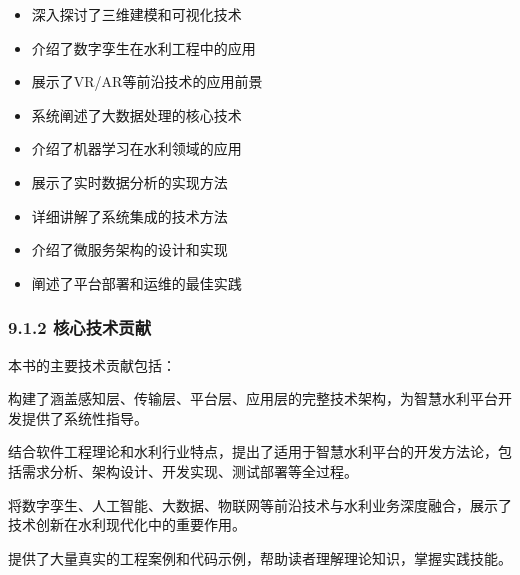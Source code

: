 
\begin{itemize}
\tightlist
\item
  深入探讨了三维建模和可视化技术
\item
  介绍了数字孪生在水利工程中的应用
\item
  展示了VR/AR等前沿技术的应用前景
\end{itemize}


\begin{itemize}
\tightlist
\item
  系统阐述了大数据处理的核心技术
\item
  介绍了机器学习在水利领域的应用
\item
  展示了实时数据分析的实现方法
\end{itemize}


\begin{itemize}
\tightlist
\item
  详细讲解了系统集成的技术方法
\item
  介绍了微服务架构的设计和实现
\item
  阐述了平台部署和运维的最佳实践
\end{itemize}

\hypertarget{ux6838ux5fc3ux6280ux672fux8d21ux732e}{%
\subsubsection{9.1.2 核心技术贡献}\label{ux6838ux5fc3ux6280ux672fux8d21ux732e}}

本书的主要技术贡献包括：


构建了涵盖感知层、传输层、平台层、应用层的完整技术架构，为智慧水利平台开发提供了系统性指导。


结合软件工程理论和水利行业特点，提出了适用于智慧水利平台的开发方法论，包括需求分析、架构设计、开发实现、测试部署等全过程。


将数字孪生、人工智能、大数据、物联网等前沿技术与水利业务深度融合，展示了技术创新在水利现代化中的重要作用。


提供了大量真实的工程案例和代码示例，帮助读者理解理论知识，掌握实践技能。

